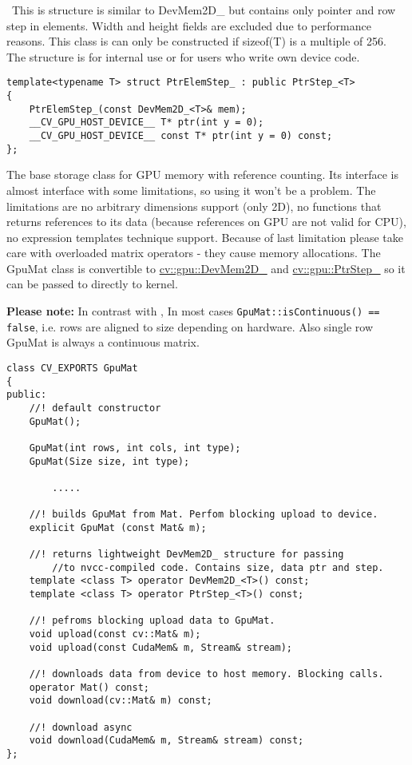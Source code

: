 \
This is structure is similar to DevMem2D\_ but contains only pointer and row step in elements. Width and height fields are excluded due to performance reasons. This class is can only be constructed if sizeof(T) is a multiple of 256. The structure is for internal use or for users who write own device code.

\begin{lstlisting}
template<typename T> struct PtrElemStep_ : public PtrStep_<T>
{                   
	PtrElemStep_(const DevMem2D_<T>& mem);
	__CV_GPU_HOST_DEVICE__ T* ptr(int y = 0);
	__CV_GPU_HOST_DEVICE__ const T* ptr(int y = 0) const;
};
\end{lstlisting}



The base storage class for GPU memory with reference counting. Its interface is almost  interface with some limitations, so using it won't be a problem. The limitations are no arbitrary dimensions support (only 2D), no functions that returns references to its data (because references on GPU are not valid for CPU), no expression templates technique support. Because of last limitation please take care with overloaded matrix operators - they cause memory allocations. The GpuMat class is convertible to  \hyperref[cppfunc.gpu.DevMem2D]{cv::gpu::DevMem2D\_} and  \hyperref[cppfunc.gpu.PtrStep]{cv::gpu::PtrStep\_} so it can be passed to directly to kernel.




\textbf{Please note:} In contrast with , In most cases \texttt{GpuMat::isContinuous() == false}, i.e. rows are aligned to size depending on hardware. Also single row GpuMat is always a continuous matrix.

\begin{lstlisting}
class CV_EXPORTS GpuMat
{
public:
	//! default constructor
	GpuMat();

	GpuMat(int rows, int cols, int type);
	GpuMat(Size size, int type);

        .....

	//! builds GpuMat from Mat. Perfom blocking upload to device.
	explicit GpuMat (const Mat& m);

	//! returns lightweight DevMem2D_ structure for passing 
        //to nvcc-compiled code. Contains size, data ptr and step.
	template <class T> operator DevMem2D_<T>() const;
	template <class T> operator PtrStep_<T>() const;

	//! pefroms blocking upload data to GpuMat.
	void upload(const cv::Mat& m);
	void upload(const CudaMem& m, Stream& stream);

	//! downloads data from device to host memory. Blocking calls.
	operator Mat() const;
	void download(cv::Mat& m) const;

	//! download async
	void download(CudaMem& m, Stream& stream) const;
};
\end{lstlisting}

